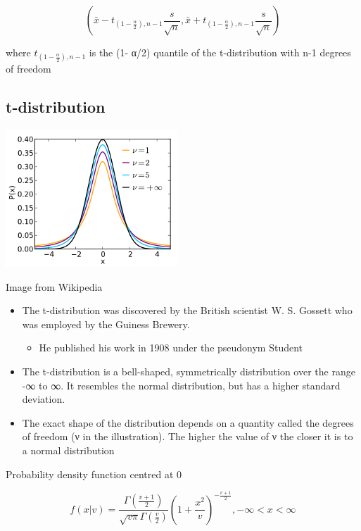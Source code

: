 \documentclass[
]{book}
\providecommand{\tightlist}{%
  \setlength{\itemsep}{0pt}\setlength{\parskip}{0pt}}
\begin{document}
\[\left(\bar x-t_{(1-\frac{\alpha}{2}),n-1}\frac{s}{\sqrt n},\bar x+t_{(1-\frac{\alpha}{2}),n-1}\frac{s}{\sqrt n}\right)\]

where \(t_{(1-\frac{\alpha}{2}),n-1}\) is the (1- α/2) quantile of the t-distribution with n-1 degrees of freedom

\hypertarget{t-distribution}{%
\subsection{t-distribution}\label{t-distribution}}

\includegraphics[width=0.5\linewidth]{./3_41}

Image from Wikipedia

\begin{itemize}
\tightlist
\item
  The t-distribution was discovered by the British scientist W. S. Gossett who was employed by the Guiness Brewery.

  \begin{itemize}
  \tightlist
  \item
    He published his work in 1908 under the pseudonym Student
  \end{itemize}
\item
  The t-distribution is a bell-shaped, symmetrically distribution over the range -∞ to ∞. It resembles the normal distribution, but has a higher standard deviation.
\item
  The exact shape of the distribution depends on a quantity called the degrees of freedom (ν in the illustration). The higher the value of ν the closer it is to a normal distribution
\end{itemize}

Probability density function centred at 0

\[f(x|v) = \frac{\Gamma\left(\frac{v+1}{2}\right)}{\sqrt {v\pi}\Gamma\left(\frac{v}{2}\right)}\left(1+\frac{x^2}{v}\right)^{-\frac{v+1}{2}},-\infty<x<\infty\]
\end{document}
